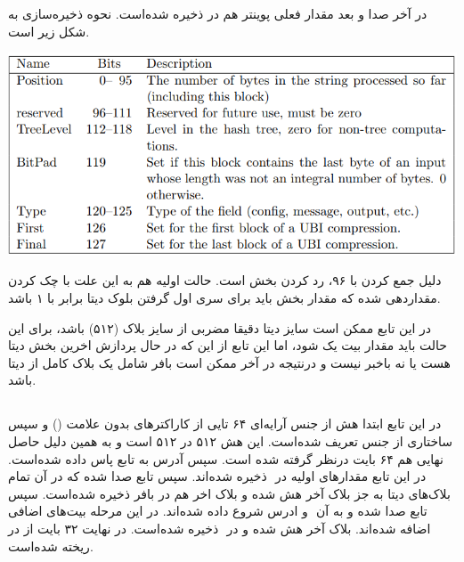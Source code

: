 در آخر \hyperref[subsec:WRITE-STATE-BIG]{}
صدا و بعد مقدار فعلی پوینتر هم در  ذخیره شده‌است.
نحوه ذخیره‌سازی  به شکل زیر است.
\begin{center}
	\includegraphics[width=14cm]{images/GoldenModelDocumentation/tweak.png}
\end{center}

دلیل جمع کردن  با ۹۶،‌ رد کردن بخش  است. حالت اولیه  هم به این علت با چک کردن  مقداردهی شده که مقدار بخش  باید برای سری اول گرفتن بلوک دیتا برابر با ۱ باشد.

در این تابع ممکن است سایز دیتا دقیقا مضربی از سایز بلاک (۵۱۲) باشد،‌ برای این حالت باید مقدار بیت  یک شود، اما این تابع از این که در حال پردازش اخرین بخش دیتا هست یا نه باخبر نیست و درنتیجه در‌ آخر ممکن است بافر شامل یک بلاک کامل از دیتا باشد.



\subsection{}
\label{subsec:skein-hash}

در این تابع ابتدا هش از جنس آرایه‌ای ۶۴ تایی از کاراکتر‌های بدون علامت () و سپس   ساختاری از جنس \hyperref[subsec:sph-skein-big-context]{} تعریف شده‌است. این هش ۵۱۲ در ۵۱۲ است و به همین دلیل حاصل نهایی هم ۶۴ بایت درنظر گرفته شده است. سپس آدرس  به تابع\hyperref[subsec:sph-skein512-init]{} پاس داده شده‌است. در این تابع مقدارهای اولیه در ‌ ذخیره شده‌اند. سپس تابع \hyperref[subsec:sph-skein512]{} صدا شده که در آن تمام بلاک‌های دیتا به جز بلاک آخر هش شده و بلاک ‌اخر هم در بافر ذخیره شده‌است. سپس تابع  \hyperref[subsec:sph-skein512-close]{} صدا شده و به آن ‌ و ادرس شروع  داده شده‌اند. در این مرحله بیت‌های اضافی اضافه شده‌اند. بلاک ‌آخر هش شده و در ‌ ذخیره شده‌است.
در نهایت ۳۲ بایت از  در  ریخته شده‌است.


